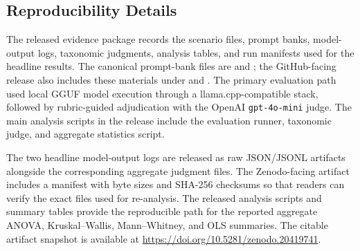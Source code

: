 \subsection{Reproducibility Details}
The released evidence package records the scenario files, prompt banks, model-output logs, taxonomic judgments, analysis tables, and run manifests used for the headline results. The canonical prompt-bank files are  and ; the GitHub-facing release also includes these materials under  and . The primary evaluation path used local GGUF model execution through a llama.cpp-compatible stack, followed by rubric-guided adjudication with the OpenAI \texttt{gpt-4o-mini} judge. The main analysis scripts in the release include the evaluation runner, taxonomic judge, and aggregate statistics script.

The two headline model-output logs are released as raw JSON/JSONL artifacts alongside the corresponding aggregate judgment files. The Zenodo-facing artifact includes a manifest with byte sizes and SHA-256 checksums so that readers can verify the exact files used for re-analysis. The released analysis scripts and summary tables provide the reproducible path for the reported aggregate ANOVA, Kruskal--Wallis, Mann--Whitney, and OLS summaries. The citable artifact snapshot is available at \url{https://doi.org/10.5281/zenodo.20419741}.

